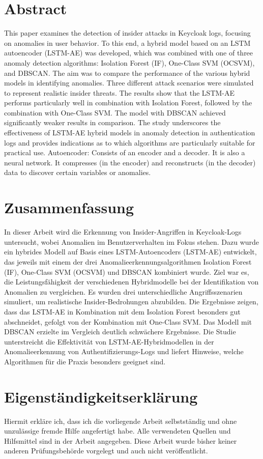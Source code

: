 \documentclass[a4paper,12pt]{article}
\begin{document}
	
	\newpage
	\section*{Abstract}
	This paper examines the detection of insider attacks in Keycloak logs, focusing on anomalies in user behavior. To this end, a hybrid model based on an LSTM autoencoder (LSTM-AE) was developed, which was combined with one of three anomaly detection algorithms: Isolation Forest (IF), One-Class SVM (OCSVM), and DBSCAN. The aim was to compare the performance of the various hybrid models in identifying anomalies. Three different attack scenarios were simulated to represent realistic insider threats. The results show that the LSTM-AE performs particularly well in combination with Isolation Forest, followed by the combination with One-Class SVM. The model with DBSCAN achieved significantly weaker results in comparison. The study underscores the effectiveness of LSTM-AE hybrid models in anomaly detection in authentication logs and provides indications as to which algorithms are particularly suitable for practical use. Autoencoder: Consists of an encoder and a decoder. It is also a neural network. It compresses (in the encoder) and reconstructs (in the decoder) data to discover certain variables or anomalies.

	
	\newpage
	\section*{Zusammenfassung}
	In dieser Arbeit wird die Erkennung von Insider-Angriffen in Keycloak-Logs untersucht, wobei Anomalien im Benutzerverhalten im Fokus stehen. Dazu wurde ein hybrides Modell auf Basis eines LSTM-Autoencoders (LSTM-AE) entwickelt, das jeweils mit einem der drei Anomalieerkennungsalgorithmen Isolation Forest (IF), One-Class SVM (OCSVM) und DBSCAN kombiniert wurde. Ziel war es, die Leistungsfähigkeit der verschiedenen Hybridmodelle bei der Identifikation von Anomalien zu vergleichen. Es wurden drei unterschiedliche Angriffsszenarien simuliert, um realistische Insider-Bedrohungen abzubilden. Die Ergebnisse zeigen, dass das LSTM-AE in Kombination mit dem Isolation Forest besonders gut abschneidet, gefolgt von der Kombination mit One-Class SVM. Das Modell mit DBSCAN erzielte im Vergleich deutlich schwächere Ergebnisse. Die Studie unterstreicht die Effektivität von LSTM-AE-Hybridmodellen in der Anomalieerkennung von Authentifizierungs-Logs und liefert Hinweise, welche Algorithmen für die Praxis besonders geeignet sind.
	\newpage
	\section*{Eigenständigkeitserklärung}
	Hiermit erkläre ich, dass ich die vorliegende Arbeit selbstständig und ohne unzulässige fremde Hilfe angefertigt habe.  
	Alle verwendeten Quellen und Hilfsmittel sind in der Arbeit angegeben.  
	Diese Arbeit wurde bisher keiner anderen Prüfungsbehörde vorgelegt und auch nicht veröffentlicht.
	\newpage
\end{document}
